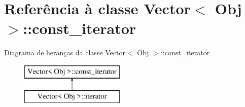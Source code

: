 \hypertarget{class_vector_1_1const__iterator}{}\section{Referência à classe Vector$<$ Obj $>$\+:\+:const\+\_\+iterator}
\label{class_vector_1_1const__iterator}
Diagrama de heranças da classe Vector$<$ Obj $>$\+:\+:const\+\_\+iterator\begin{figure}[H]
\begin{center}
\leavevmode
\includegraphics[height=2.000000cm]{class_vector_1_1const__iterator}
\end{center}
\end{figure}
